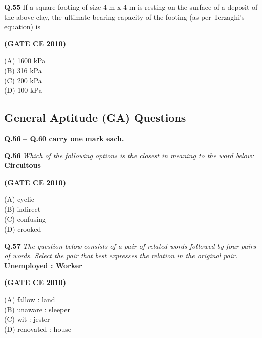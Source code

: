 \documentclass[journal,12pt,onecolumn]{exam}
\theoremstyle{remark}
\begin{document}
\setlength{\parskip}{0.5cm}

\noindent\textbf{Q.55} If a square footing of size 4 m x 4 m is resting on the surface of a deposit of the above clay, the ultimate bearing capacity of the footing (as per Terzaghi’s equation) is

\setlength{\parskip}{0.5cm}

\hfill\textbf{(GATE CE 2010)}

\begin{multicols}{4}
\noindent(A) 1600 kPa\\
(B) 316 kPa\\
(C) 200 kPa\\
(D) 100 kPa
\end{multicols}

\begin{flushleft}
\section*{General Aptitude (GA) Questions}

\noindent\textbf{Q.56 -- Q.60 carry one mark each.}

\setlength{\parskip}{0.5cm}

\noindent\textbf{Q.56} \textit{Which of the following options is the closest in meaning to the word below:}\\
\textbf{Circuitous}

\hfill\textbf{(GATE CE 2010)}

\begin{multicols}{4}
\noindent(A) cyclic\\
(B) indirect\\
(C) confusing\\
(D) crooked
\end{multicols}

\setlength{\parskip}{0.5cm}

\noindent\textbf{Q.57} \textit{The question below consists of a pair of related words followed by four pairs of words. Select the pair that best expresses the relation in the original pair.}\\
\textbf{Unemployed : Worker}

\hfill\textbf{(GATE CE 2010)}

\begin{multicols}{4}
\noindent(A) fallow : land\\
(B) unaware : sleeper\\
(C) wit : jester\\
(D) renovated : house
\end{multicols}


\end{flushleft}
\end{document}
